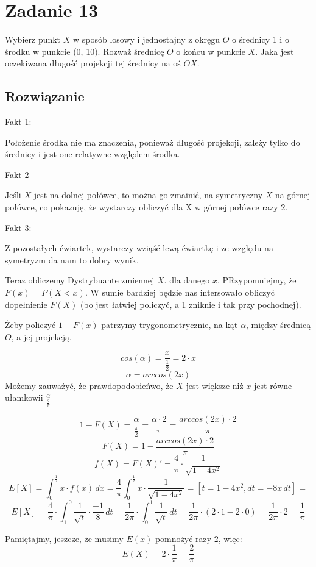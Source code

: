 \section{Zadanie 13}

Wybierz punkt \(X\) w sposób losowy i jednostajny z okręgu \(O\) o średnicy 1 i o środku w punkcie (0, 10). Rozważ średnicę \(O\) o końcu w punkcie \(X\). Jaka jest oczekiwana długość projekcji tej średnicy na oś \(OX\).

\subsection*{Rozwiązanie}

Fakt 1:

Położenie środka nie ma znaczenia, ponieważ długość projekcji, zależy tylko do średnicy i jest one relatywne względem środka.

Fakt 2

Jeśli \(X\) jest na dolnej połówce, to można go zmainić, na symetryczny \(X\) na górnej połówce, co pokazuję, że wystarczy obliczyć dla X w górnej połówce razy 2.

Fakt 3:

Z pozostałych ćwiartek, wystarczy wziąść lewą ćwiartkę i ze względu na symetryzm da nam to dobry wynik.


Teraz obliczemy Dystrybuante zmiennej \(X\). dla danego \(x\). PRzypomniejmy, że \(F(x) = P(X < x)\). W sumie bardziej będzie nas intersowało obliczyć dopełnienie \(F(X)\) (bo jest łatwiej policzyć, a 1 zniknie i tak przy pochodnej).

Żeby policzyć \(1 - F(x)\) patrzymy trygonometrycznie, na kąt \(\alpha\), między średnicą \(O\), a jej projekcją.

\[
	cos(\alpha) = \frac{x}{\frac{1}{2}} = 2 \cdot x
\]
\[
	\alpha = arccos(2x)
\]
Możemy zauważyć, że prawdopodobieńwo, że \(X\) jest większe niż \(x\) jest równe ułamkowii \(\frac{\alpha}{\frac{2}{\pi}}\)

\[
	1 - F(X) =  \frac{\alpha}{\frac{\pi}{2}} = \frac{\alpha \cdot 2}{\pi} = \frac{arccos(2x) \cdot 2}{\pi}
\]
\[
	F(X) = 1 - \frac{arccos(2x) \cdot 2}{\pi}
\]
\[
	f(X) = F(X)' = \frac{4}{\pi} \cdot \frac{1}{\sqrt{1 - 4 x^2}}
\]
\[
	E[X] = \int_{0}^{\frac{1}{2}} x \cdot f(x)\,dx = \frac{4}{\pi} \int_{0}^{\frac{1}{2}} x \cdot \frac{1}{\sqrt{1 - 4x^2}} = [t = 1 - 4x^2, dt = -8x\,dt] =
\]
\[
	E[X] = \frac{4}{\pi} \cdot \int_{1}^{0} \frac{1}{\sqrt{t}} \cdot \frac{-1}{8}\,dt = \frac{1}{2 \pi} \cdot \int_{0}^{1} \frac{1}{\sqrt{t}}\,dt = \frac{1}{2 \pi} \cdot (2 \cdot 1 - 2 \cdot 0) = \frac{1}{2 \pi} \cdot 2 = \frac{1}{\pi}
\]

Pamiętajmy, jeszcze, że musimy \(E(x)\) pomnożyć razy \(2\), więc:
\[
	E(X) = 2 \cdot \frac{1}{\pi} = \frac{2}{\pi}
\]

